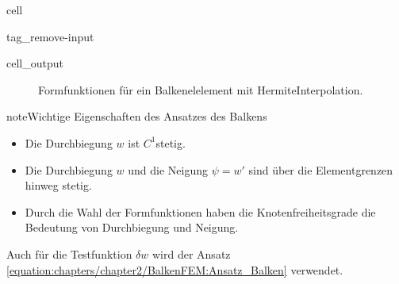 \documentclass[letterpaper,10pt,german]{jupyterBook}
\begin{document}
\begin{sphinxuseclass}{cell}
\begin{sphinxuseclass}{tag_remove-input}\begin{sphinxVerbatimOutput}

\begin{sphinxuseclass}{cell_output}
\begin{figure}[htbp]
\centering
\capstart

\noindent{}
\caption{Formfunktionen für ein Balkenelelement mit Hermite\sphinxhyphen{}Interpolation.}\label{\detokenize{chapters/chapter2/BalkenFEM:shape-beam}}\end{figure}

\end{sphinxuseclass}\end{sphinxVerbatimOutput}

\end{sphinxuseclass}
\end{sphinxuseclass}
\begin{sphinxadmonition}{note}{Wichtige Eigenschaften des Ansatzes des Balkens}
\begin{itemize}
\item {} 
\sphinxAtStartPar
Die Durchbiegung \(w\) ist \(C^1\)\sphinxhyphen{}stetig.

\item {} 
\sphinxAtStartPar
Die Durchbiegung \(w\) und die Neigung \(\psi=w'\) sind über die Elementgrenzen hinweg stetig.

\item {} 
\sphinxAtStartPar
Durch die Wahl der Formfunktionen haben die Knotenfreiheitsgrade die Bedeutung von Durchbiegung und Neigung.

\end{itemize}
\end{sphinxadmonition}

\sphinxAtStartPar
Auch für die Testfunktion \(\delta w\) wird der Ansatz \eqref{equation:chapters/chapter2/BalkenFEM:Ansatz_Balken} verwendet.
\end{document}
